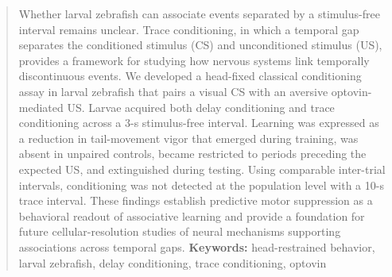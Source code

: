 \maketitle
\begin{abstract}
	Whether larval zebrafish can associate events separated by a stimulus-free interval remains unclear. Trace conditioning, in which a temporal gap separates the conditioned stimulus (CS) and unconditioned stimulus (US), provides a framework for studying how nervous systems link temporally discontinuous events. We developed a head-fixed classical conditioning assay in larval zebrafish that pairs a visual CS with an aversive optovin-mediated US. Larvae acquired both delay conditioning and trace conditioning across a 3-s stimulus-free interval. Learning was expressed as a reduction in tail-movement vigor that emerged during training, was absent in unpaired controls, became restricted to periods preceding the expected US, and extinguished during testing. Using comparable inter-trial intervals, conditioning was not detected at the population level with a 10-s trace interval. These findings establish predictive motor suppression as a behavioral readout of associative learning and provide a foundation for future cellular-resolution studies of neural mechanisms supporting associations across temporal gaps.
	\textbf{Keywords:} head-restrained behavior, larval zebrafish, delay conditioning, trace conditioning, optovin
\end{abstract}

